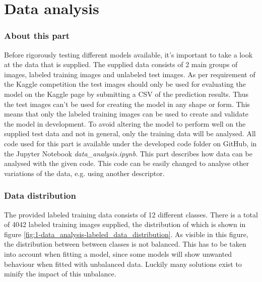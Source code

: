 \part{Data analysis}
\label{part:data_analysis}


\section{About this part}
\label{section:DA_about_part}
Before rigorously testing different models available, it's important to take a look at the data that is supplied. The supplied data consists of 2 main groups of images, labeled training images and unlabeled test images.
As per requirement of the Kaggle competition the test images should only be used for evaluating the model on the Kaggle page by submitting a CSV of the prediction results.
Thus the test images can't be used for creating the model in any shape or form.
This means that only the labeled training images can be used to create and validate the model in development.
To avoid altering the model to perform well on the supplied test data and not in general, only the training data will be analysed.
All code used for this part is available under the developed code folder on GitHub, in the Jupyter Notebook \emph{data\_analysis.ipynb}.
This part describes how data can be analysed with the given code.
This code can be easily changed to analyse other variations of the data, e.g. using another descriptor.


\section{Data distribution}
\label{section:DA_data_distribution}
The provided labeled training data consists of 12 different classes.
There is a total of 4042 labeled training images supplied, the distribution of which is shown in figure \ref{fig:1-data_analysis-labeled_data_distribution}.
As visible in this figure, the distribution between between classes is not balanced.
This has to be taken into account when fitting a model, since some models will show unwanted behaviour when fitted with unbalanced data.
Luckily many solutions exist to minify the impact of this unbalance.


